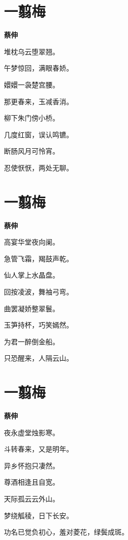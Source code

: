 \documentclass[12pt,a4paper]{ctexbook}
\begin{document}
\section{一翦梅}
\textbf{蔡伸}\par\vspace{0.5em}
堆枕乌云堕翠翘。\par
午梦惊回，满眼春娇。\par
嬛嬛一袅楚宫腰。\par
那更春来，玉减香消。\par
柳下朱门傍小桥。\par
几度红窗，误认鸣镳。\par
断肠风月可怜宵。\par
忍使恹恹，两处无聊。\par

\section{一翦梅}
\textbf{蔡伸}\par\vspace{0.5em}
高宴华堂夜向阑。\par
急管飞霜，羯鼓声乾。\par
仙人掌上水晶盘。\par
回按凌波，舞袖弓弯。\par
曲罢凝娇整翠鬟。\par
玉笋持杯，巧笑嫣然。\par
为君一醉倒金船。\par
只恐醒来，人隔云山。\par

\section{一翦梅}
\textbf{蔡伸}\par\vspace{0.5em}
夜永虚堂烛影寒。\par
斗转春来，又是明年。\par
异乡怀抱只凄然。\par
尊酒相逢且自宽。\par
天际孤云云外山。\par
梦绕觚稜，日下长安。\par
功名已觉负初心，羞对菱花，绿鬓成斑。\par
\end{document}
